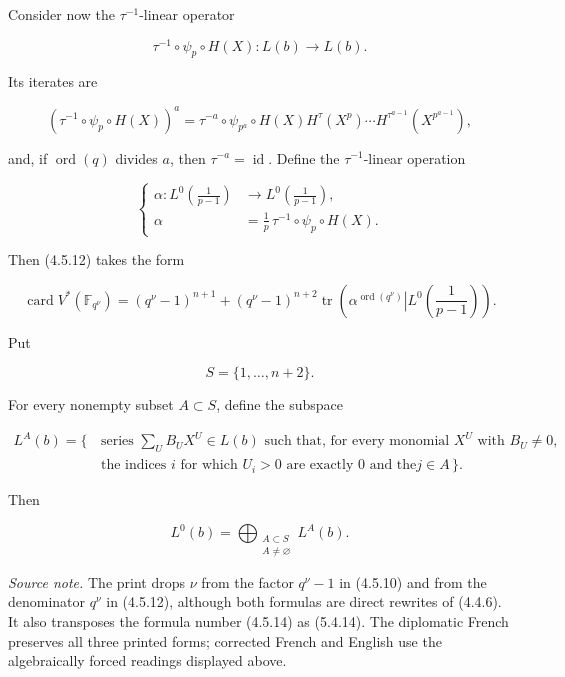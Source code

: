 Consider now the $\tau^{-1}$-linear operator

\begin{equation}\tag{4.5.13}
\tau^{-1}\circ\psi_p\circ H(X):L(b)\longrightarrow L(b).
\end{equation}

Its iterates are

\begin{equation}\tag{4.5.14}
(\tau^{-1}\circ\psi_p\circ H(X))^a
=\tau^{-a}\circ\psi_{p^a}\circ
H(X)H^\tau(X^p)\cdots H^{\tau^{a-1}}(X^{p^{a-1}}),
\end{equation}

and, if $\operatorname{ord}(q)$ divides $a$, then $\tau^{-a}=\operatorname{id}$.
Define the $\tau^{-1}$-linear operation

\begin{equation}\tag{4.5.15}
\left\{
\begin{aligned}
\alpha:L^0\!\left(\frac1{p-1}\right)
&\longrightarrow L^0\!\left(\frac1{p-1}\right),\\
\alpha&=\frac1p\,\tau^{-1}\circ\psi_p\circ H(X).
\end{aligned}
\right.
\end{equation}

Then (4.5.12) takes the form

\begin{equation}\tag{4.5.16}
\operatorname{card}V^*(\mathbb F_{q^\nu})
=(q^\nu-1)^{n+1}
+(q^\nu-1)^{n+2}
\operatorname{tr}\!\left(
\left.\alpha^{\operatorname{ord}(q^\nu)}
\right|L^0\!\left(\frac1{p-1}\right)\right).
\end{equation}

Put

\begin{equation}\tag{4.5.17}
S=\{1,\ldots,n+2\}.
\end{equation}

For every nonempty subset $A\subset S$, define the subspace

\begin{equation}\tag{4.5.18}
\begin{aligned}
L^A(b)=\{\,&\text{series $\sum_U B_UX^U\in L(b)$ such that, for every
monomial $X^U$ with $B_U\ne0$,}\\
&\text{the indices $i$ for which $U_i>0$ are exactly $0$ and the
$j\in A$}\,\}.
\end{aligned}
\end{equation}

Then

\begin{equation}\tag{4.5.19}
L^0(b)=\bigoplus_{\substack{A\subset S\\A\ne\varnothing}}L^A(b).
\end{equation}

\medskip
\noindent\emph{Source note.}
The print drops $\nu$ from the factor $q^\nu-1$ in (4.5.10) and from the
denominator $q^\nu$ in (4.5.12), although both formulas are direct rewrites
of (4.4.6). It also transposes the formula number (4.5.14) as (5.4.14).
The diplomatic French preserves all three printed forms; corrected French
and English use the algebraically forced readings displayed above.
